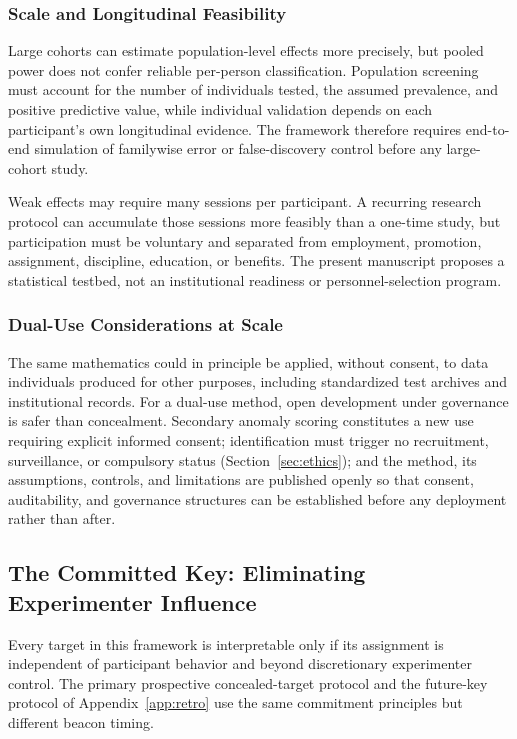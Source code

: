 \documentclass[11pt,letterpaper]{article}
\begin{document}
\subsubsection{Scale and Longitudinal Feasibility}
Large cohorts can estimate population-level effects more precisely, but pooled power does not confer reliable per-person classification. Population screening must account for the number of individuals tested, the assumed prevalence, and positive predictive value, while individual validation depends on each participant's own longitudinal evidence. The framework therefore requires end-to-end simulation of familywise error or false-discovery control before any large-cohort study.

Weak effects may require many sessions per participant. A recurring research protocol can accumulate those sessions more feasibly than a one-time study, but participation must be voluntary and separated from employment, promotion, assignment, discipline, education, or benefits. The present manuscript proposes a statistical testbed, not an institutional readiness or personnel-selection program.

\subsubsection{Dual-Use Considerations at Scale}

The same mathematics could in principle be applied, without consent, to data individuals produced for other purposes, including standardized test archives and institutional records. For a dual-use method, open development under governance is safer than concealment. Secondary anomaly scoring constitutes a new use requiring explicit informed consent; identification must trigger no recruitment, surveillance, or compulsory status (Section~\ref{sec:ethics}); and the method, its assumptions, controls, and limitations are published openly so that consent, auditability, and governance structures can be established before any deployment rather than after.

\subsection{The Committed Key: Eliminating Experimenter Influence}
\label{sec:committed-key}

Every target in this framework is interpretable only if its assignment is independent of participant behavior and beyond discretionary experimenter control. The primary prospective concealed-target protocol and the future-key protocol of Appendix~\ref{app:retro} use the same commitment principles but different beacon timing.
\end{document}
